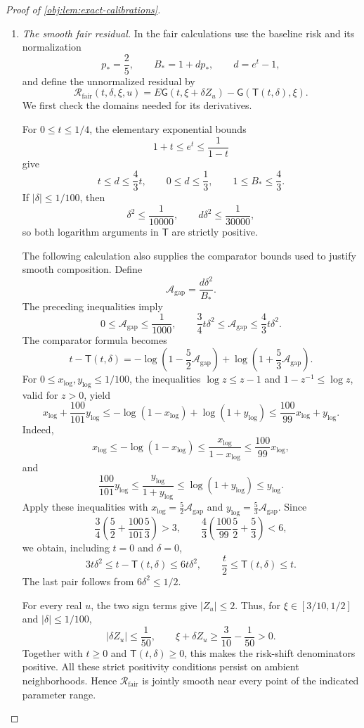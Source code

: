 \begin{proof}[Proof of \cref{obj:lem:exact-calibrations}]
\begin{enumerate}
\item \emph{The smooth fair residual.}
In the fair calculations use the baseline risk and its normalization
\[
p_*=\frac25,\qquad B_*=1+dp_*,
\qquad d=e^t-1,
\]
and define the unnormalized residual by
\[
\mathcal R_{\mathrm{fair}}(t,\delta,\xi,u)
=
E\mathsf G(t,\xi+\delta Z_u)
-\mathsf G(\mathsf T(t,\delta),\xi).
\]
We first check the domains needed for its derivatives.

For \(0\le t\le1/4\), the elementary exponential bounds
\[
1+t\le e^t\le\frac1{1-t}
\]
give
\[
t\le d\le\frac43t,\qquad
0\le d\le\frac13,\qquad
1\le B_*\le\frac43.
\]
If \(|\delta|\le1/100\), then
\[
\delta^2\le\frac1{10000},
\qquad
d\delta^2\le\frac1{30000},
\]
so both logarithm arguments in \(\mathsf T\) are strictly positive.

The following calculation also supplies the comparator bounds used to justify smooth composition. Define
\[
\mathcal A_{\mathrm{gap}}=\frac{d\delta^2}{B_*}.
\]
The preceding inequalities imply
\[
0\le\mathcal A_{\mathrm{gap}}\le\frac1{1000},
\qquad
\frac34t\delta^2\le\mathcal A_{\mathrm{gap}}
\le\frac43t\delta^2.
\]
The comparator formula becomes
\[
t-\mathsf T(t,\delta)
=
-\log\!\left(1-\frac52\mathcal A_{\mathrm{gap}}\right)
+\log\!\left(1+\frac53\mathcal A_{\mathrm{gap}}\right).
\]
For \(0\le x_{\log},y_{\log}\le1/100\), the inequalities
\(\log z\le z-1\) and \(1-z^{-1}\le\log z\), valid for \(z>0\), yield
\[
x_{\log}+\frac{100}{101}y_{\log}
\le-\log(1-x_{\log})+\log(1+y_{\log})
\le\frac{100}{99}x_{\log}+y_{\log}.
\]
Indeed,
\[
x_{\log}\le-\log(1-x_{\log})
\le\frac{x_{\log}}{1-x_{\log}}
\le\frac{100}{99}x_{\log},
\]
and
\[
\frac{100}{101}y_{\log}
\le\frac{y_{\log}}{1+y_{\log}}
\le\log(1+y_{\log})\le y_{\log}.
\]
Apply these inequalities with
\(x_{\log}=\frac52\mathcal A_{\mathrm{gap}}\) and
\(y_{\log}=\frac53\mathcal A_{\mathrm{gap}}\). Since
\[
\frac34\left(\frac52+\frac{100}{101}\frac53\right)>3,
\qquad
\frac43\left(\frac{100}{99}\frac52+\frac53\right)<6,
\]
we obtain, including \(t=0\) and \(\delta=0\),
\[
3t\delta^2\le t-\mathsf T(t,\delta)\le6t\delta^2,
\qquad
\frac t2\le\mathsf T(t,\delta)\le t.
\]
The last pair follows from \(6\delta^2\le1/2\).

For every real \(u\), the two sign terms give \(|Z_u|\le2\). Thus, for
\(\xi\in[3/10,1/2]\) and \(|\delta|\le1/100\),
\[
|\delta Z_u|\le\frac1{50},
\qquad
\xi+\delta Z_u\ge\frac3{10}-\frac1{50}>0.
\]
Together with \(t\ge0\) and \(\mathsf T(t,\delta)\ge0\), this makes the risk-shift denominators positive. All these strict positivity conditions persist on ambient neighborhoods. Hence \(\mathcal R_{\mathrm{fair}}\) is jointly smooth near every point of the indicated parameter range.


\end{enumerate}
\end{proof}
